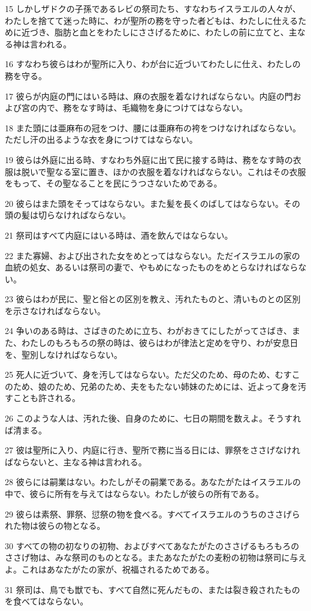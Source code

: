 \par 15 しかしザドクの子孫であるレビの祭司たち、すなわちイスラエルの人々が、わたしを捨てて迷った時に、わが聖所の務を守った者どもは、わたしに仕えるために近づき、脂肪と血とをわたしにささげるために、わたしの前に立てと、主なる神は言われる。
\par 16 すなわち彼らはわが聖所に入り、わが台に近づいてわたしに仕え、わたしの務を守る。
\par 17 彼らが内庭の門にはいる時は、麻の衣服を着なければならない。内庭の門および宮の内で、務をなす時は、毛織物を身につけてはならない。
\par 18 また頭には亜麻布の冠をつけ、腰には亜麻布の袴をつけなければならない。ただし汗の出るような衣を身につけてはならない。
\par 19 彼らは外庭に出る時、すなわち外庭に出て民に接する時は、務をなす時の衣服は脱いで聖なる室に置き、ほかの衣服を着なければならない。これはその衣服をもって、その聖なることを民にうつさないためである。
\par 20 彼らはまた頭をそってはならない。また髪を長くのばしてはならない。その頭の髪は切らなければならない。
\par 21 祭司はすべて内庭にはいる時は、酒を飲んではならない。
\par 22 また寡婦、および出された女をめとってはならない。ただイスラエルの家の血統の処女、あるいは祭司の妻で、やもめになったものをめとらなければならない。
\par 23 彼らはわが民に、聖と俗との区別を教え、汚れたものと、清いものとの区別を示さなければならない。
\par 24 争いのある時は、さばきのために立ち、わがおきてにしたがってさばき、また、わたしのもろもろの祭の時は、彼らはわが律法と定めを守り、わが安息日を、聖別しなければならない。
\par 25 死人に近づいて、身を汚してはならない。ただ父のため、母のため、むすこのため、娘のため、兄弟のため、夫をもたない姉妹のためには、近よって身を汚すことも許される。
\par 26 このような人は、汚れた後、自身のために、七日の期間を数えよ。そうすれば清まる。
\par 27 彼は聖所に入り、内庭に行き、聖所で務に当る日には、罪祭をささげなければならないと、主なる神は言われる。
\par 28 彼らには嗣業はない。わたしがその嗣業である。あなたがたはイスラエルの中で、彼らに所有を与えてはならない。わたしが彼らの所有である。
\par 29 彼らは素祭、罪祭、愆祭の物を食べる。すべてイスラエルのうちのささげられた物は彼らの物となる。
\par 30 すべての物の初なりの初物、およびすべてあなたがたのささげるもろもろのささげ物は、みな祭司のものとなる。またあなたがたの麦粉の初物は祭司に与えよ。これはあなたがたの家が、祝福されるためである。
\par 31 祭司は、鳥でも獣でも、すべて自然に死んだもの、または裂き殺されたものを食べてはならない。

